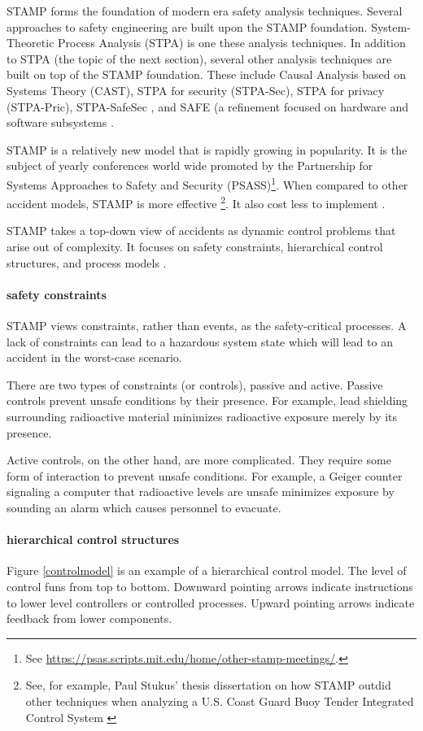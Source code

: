 \documentclass[../../main/main.tex]{subfiles}
\begin{document}
STAMP forms the foundation of modern era safety analysis techniques.  Several approaches to safety engineering are built upon the STAMP foundation.  System-Theoretic Process Analysis (STPA) is one these analysis techniques.  In addition to STPA (the topic of the next section), several other analysis techniques are built on top of the STAMP foundation.  These include Causal Analysis based on Systems Theory (CAST), STPA for security (STPA-Sec), STPA for privacy (STPA-Pric), STPA-SafeSec \cite{safe}, and SAFE (a refinement focused on hardware and software subsystems \cite{safe}.

STAMP is a relatively new model that is rapidly growing in popularity.  It is the subject of yearly conferences world wide promoted by the Partnership for Systems Approaches to Safety and Security (PSASS)\footnote{See \url{https://psas.scripts.mit.edu/home/other-stamp-meetings/}.}.  When compared to other accident models, STAMP is more effective \footnote{See, for example, Paul Stukus' thesis dissertation on how STAMP outdid other techniques when analyzing a U.S. Coast Guard Buoy Tender Integrated Control System \cite{buoy}}.  It also cost less to implement \cite{stpa}.


STAMP takes a top-down view of accidents as dynamic control problems that arise out of complexity.  It focuses on safety constraints, hierarchical control structures, and process models \cite{saferworld}. 

\paragraph*{safety constraints}
STAMP views constraints, rather than events, as the safety-critical processes.  A lack of constraints can lead to a hazardous system state which will lead to an accident in the worst-case scenario.  

There are two types of constraints (or controls), passive and active.  Passive controls prevent unsafe conditions by their presence.  For example, lead shielding surrounding radioactive material minimizes radioactive exposure merely by its presence.  

Active controls, on the other hand, are more complicated.  They require some form of interaction to prevent unsafe conditions.  For example, a Geiger counter signaling a computer that radioactive levels are unsafe minimizes exposure by sounding an alarm which causes personnel to evacuate.  

\paragraph*{hierarchical control structures}
Figure \ref{controlmodel} is an example of a hierarchical control model.  The level of control funs from top to bottom.  Downward pointing arrows indicate instructions to lower level controllers or controlled processes.  Upward pointing arrows indicate feedback from lower components.   
\end{document}
